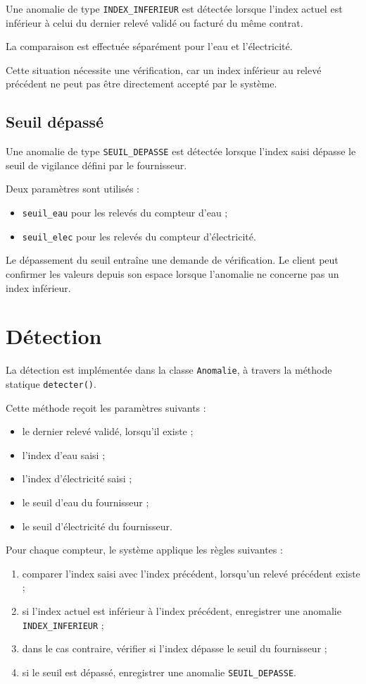 Une anomalie de type \texttt{INDEX\_INFERIEUR} est détectée lorsque l'index actuel est inférieur à celui du dernier relevé validé ou facturé du même contrat.

La comparaison est effectuée séparément pour l'eau et l'électricité.

Cette situation nécessite une vérification, car un index inférieur au relevé précédent ne peut pas être directement accepté par le système.

\subsection{Seuil dépassé}

Une anomalie de type \texttt{SEUIL\_DEPASSE} est détectée lorsque l'index saisi dépasse le seuil de vigilance défini par le fournisseur.

Deux paramètres sont utilisés :
\begin{itemize}
    \item \texttt{seuil\_eau} pour les relevés du compteur d'eau ;
    \item \texttt{seuil\_elec} pour les relevés du compteur d'électricité.
\end{itemize}

Le dépassement du seuil entraîne une demande de vérification. Le client peut confirmer les valeurs depuis son espace lorsque l'anomalie ne concerne pas un index inférieur.

\section{Détection}

La détection est implémentée dans la classe \texttt{Anomalie}, à travers la méthode statique \texttt{detecter()}.

Cette méthode reçoit les paramètres suivants :
\begin{itemize}
    \item le dernier relevé validé, lorsqu'il existe ;
    \item l'index d'eau saisi ;
    \item l'index d'électricité saisi ;
    \item le seuil d'eau du fournisseur ;
    \item le seuil d'électricité du fournisseur.
\end{itemize}

Pour chaque compteur, le système applique les règles suivantes :
\begin{enumerate}
    \item comparer l'index saisi avec l'index précédent, lorsqu'un relevé précédent existe ;
    \item si l'index actuel est inférieur à l'index précédent, enregistrer une anomalie \texttt{INDEX\_INFERIEUR} ;
    \item dans le cas contraire, vérifier si l'index dépasse le seuil du fournisseur ;
    \item si le seuil est dépassé, enregistrer une anomalie \texttt{SEUIL\_DEPASSE}.
\end{enumerate}

